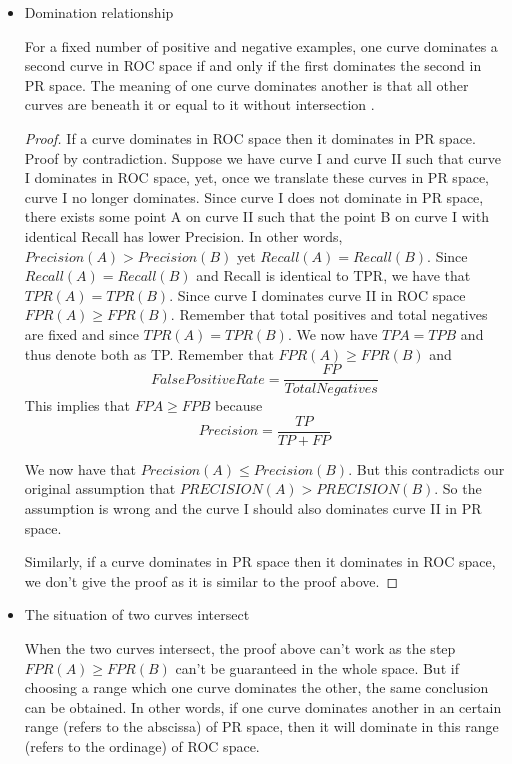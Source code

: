 \documentclass[a4paper,12pt]{article}
\begin{document}
\begin{itemize}
\item Domination relationship 

For a fixed number of positive and negative examples, one curve dominates a second curve in ROC space if and only if the first dominates the second
in PR space. The meaning of one curve dominates another is that all other curves are beneath it or equal to it without intersection \cite{3:article}.

\begin{proof} If a curve dominates in ROC space then it dominates in PR space. Proof by contradiction. Suppose we have curve I and curve II such that curve I dominates in ROC space, yet, once we translate these curves in PR space, curve I no longer dominates. Since curve I does not dominate in PR space, there exists some point A on curve II such that the point B on curve I with identical Recall has lower Precision. In other words, $Precision(A)>Precision(B)$ yet $Recall(A) = Recall(B)$. Since $Recall(A) = Recall(B)$ and Recall is identical to TPR, we have that $TPR(A) = TPR(B)$. Since curve I dominates curve II in ROC space $FPR(A) ≥ FPR(B)$. Remember that total positives and total negatives are fixed and since $TPR(A) = TPR(B)$. We now have $TPA = TPB$ and thus denote both as TP. Remember that $FPR(A)\ge FPR(B)$ and  
\begin{equation}\label{eq:FPR}
FalsePositiveRate=\frac{FP}{Total Negatives}
\end{equation}    
 This implies that $FPA \ge FPB$ because
\begin{equation}\label{eq:P}
Precision=\frac{TP}{TP+FP}
\end{equation}

We now have that $Precision (A)\le Precision (B)$. But this contradicts our original assumption that $PRECISION (A) >PRECISION (B)$. So the assumption is wrong and the curve I should also dominates curve II in PR space.

Similarly, if a curve dominates in PR space then it dominates in ROC space, we don't give the proof as it is similar to the proof above.
\end{proof}
\item The situation of two curves intersect 

When the two curves intersect, the proof above can't work as the step $FPR(A)\ge FPR(B)$ can't be guaranteed in the whole space. But if choosing a range which one curve dominates the other, the same conclusion can be obtained. In other words, if one curve dominates another in an certain range (refers to the abscissa) of PR space, then it will dominate in this range (refers to the ordinage) of ROC space. 


\end{itemize}
\end{document}
